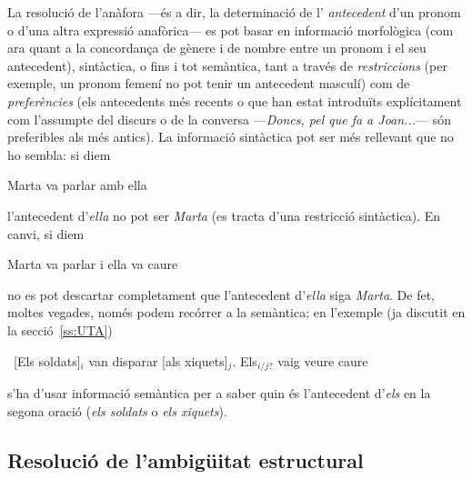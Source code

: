 La resolució de l'anàfora ---és a dir, la determinació de l'{\em
  antecedent} d'un pronom o d'una altra expressió anafòrica--- es pot
basar en informació morfològica (com ara quant a la
concordança de gènere i de nombre entre un pronom i el seu
antecedent), sintàctica, o fins i tot semàntica, tant a través de
  \emph{restriccions} (per exemple, un pronom femení no pot tenir un
  antecedent masculí) com de \emph{preferències} (els antecedents més
  recents o que han estat introduïts explícitament com l'assumpte del discurs
  o de la conversa ---\emph{Doncs, pel que fa a Joan...}--- són preferibles als més antics). La informació
sintàctica pot ser més rellevant que no ho sembla: si diem
\begin{exemple}Marta va parlar amb ella\end{exemple}
l'antecedent d'\emph{ella} no pot ser \emph{Marta} (es tracta d'una
restricció sintàctica). En canvi, si diem
\begin{exemple}Marta va parlar i ella va caure\end{exemple} 
no es pot descartar completament que l'antecedent d'\emph{ella} siga
\emph{Marta}. De fet, moltes vegades, només podem recórrer a la
semàntica; en l'exemple (ja discutit en la secció~\ref{ss:UTA})
\begin{exemple}
\ [Els soldats]$_i$ van disparar [als xiquets]$_j$. Els$_{i/j?}$
vaig veure caure
\end{exemple}
s'ha d'usar informació semàntica per a saber quin és l'antecedent
d'\emph{els} en la segona oració (\emph{els soldats} o \emph{els
  xiquets}).



\subsection{Resolució de l'ambigüitat estructural}
\label{s3:resambest}

